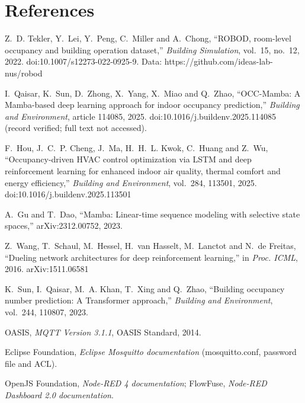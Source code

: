 \documentclass[12pt,a4paper,oneside]{report}
\begin{document}
\chapter*{References}
\begin{enumerate}[label={[\arabic*]},leftmargin=*]
\item Z.~D. Tekler, Y.~Lei, Y.~Peng, C.~Miller and A.~Chong, ``ROBOD, room-level occupancy and building operation
  dataset,'' \emph{Building Simulation}, vol.~15, no.~12, 2022. doi:10.1007/s12273-022-0925-9. Data:
  https://github.com/ideas-lab-nus/robod
\item I.~Qaisar, K.~Sun, D.~Zhong, X.~Yang, X.~Miao and Q.~Zhao, ``OCC-Mamba: A Mamba-based deep learning approach
  for indoor occupancy prediction,'' \emph{Building and Environment}, article 114085, 2025.
  doi:10.1016/j.buildenv.2025.114085 (record verified; full text not accessed).
\item F.~Hou, J.~C.~P. Cheng, J.~Ma, H.~H.~L. Kwok, C.~Huang and Z.~Wu, ``Occupancy-driven HVAC control optimization
  via LSTM and deep reinforcement learning for enhanced indoor air quality, thermal comfort and energy efficiency,''
  \emph{Building and Environment}, vol.~284, 113501, 2025. doi:10.1016/j.buildenv.2025.113501
\item A.~Gu and T.~Dao, ``Mamba: Linear-time sequence modeling with selective state spaces,'' arXiv:2312.00752, 2023.
\item Z.~Wang, T.~Schaul, M.~Hessel, H.~van Hasselt, M.~Lanctot and N.~de Freitas, ``Dueling network architectures for
  deep reinforcement learning,'' in \emph{Proc. ICML}, 2016. arXiv:1511.06581
\item K.~Sun, I.~Qaisar, M.~A. Khan, T.~Xing and Q.~Zhao, ``Building occupancy number prediction: A Transformer
  approach,'' \emph{Building and Environment}, vol.~244, 110807, 2023.
\item OASIS, \emph{MQTT Version 3.1.1}, OASIS Standard, 2014.
\item Eclipse Foundation, \emph{Eclipse Mosquitto documentation} (mosquitto.conf, password file and ACL).
\item OpenJS Foundation, \emph{Node-RED 4 documentation}; FlowFuse, \emph{Node-RED Dashboard 2.0 documentation}.
\end{enumerate}

\appendix
\end{document}
